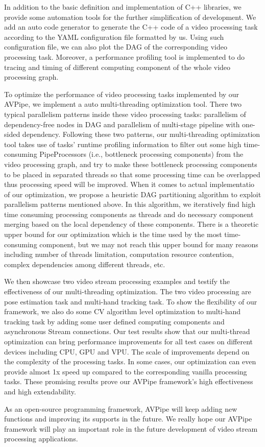 \begin{bigabstract}
In addition to the basic definition and implementation of C++ libraries, we provide some automation tools for the further simplification of development. We add an auto code generator to generate the C++ code of a video processing task according to the YAML configuration file formatted by us. Using such configuration file, we can also plot the DAG of the corresponding video processing task. Moreover, a performance profiling tool is implemented to do tracing and timing of different computing component of the whole video processing graph.

To optimize the performance of video processing tasks implemented by our AVPipe, we implement a auto multi-threading optimization tool. There two typical parallelism patterns inside these video processing tasks: parallelism of dependency-free nodes in DAG and parallelism of multi-stage pipeline with one-sided dependency.  Following these two patterns, our multi-threading optimization tool takes use of tasks' runtime profiling information to filter out some high time-consuming PipeProcessors (i.e., bottleneck processing components) from the video processing graph, and try to make these bottleneck processing components to be placed in separated threads so that some processing time can be overlapped thus processing speed will be improved. When it comes to actual implementatio of our optimization, we propose  a heuristic DAG partitioning algorithm to exploit parallelism patterns mentioned above. In this algorithm, we iteratively find high time consuming processing components as threads and do necessary component merging based on the local dependency of these components. There is a theoretic upper bound for our optimization which is the time used by the most time-consuming component, but we may not reach this upper bound for many reasons including number of threads limitation, computation resource contention, complex dependencies among different threads, etc.

We then showcase two video stream processing examples and testify the effectiveness of our multi-threading optimization. The two video processing are pose estimation task and multi-hand tracking task. To show the flexibility of our framework, we also do some CV algorithm level optimization to multi-hand tracking task by adding some user defined computing components and asynchronous Stream connections. Our test results show that our multi-thread optimization can bring performance improvements for all test cases on different devices including CPU, GPU and VPU. The scale of improvements depend on the complexity of the processing tasks. In some cases, our optimization can even provide almost 1x speed up compared to the corresponding vanilla processing tasks. These promising results prove our AVPipe framework's high effectiveness and high extendability.

As an open-source programming framework, AVPipe will keep adding new functions and improving its supports in the future. We really hope our AVPipe framework will play an important role in the future development of video stream processing applications.





\end{bigabstract}
